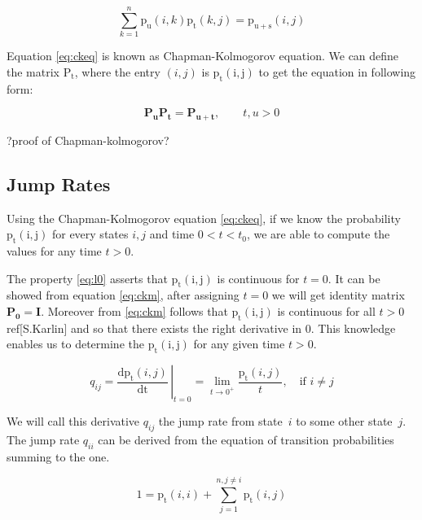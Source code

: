 \documentclass[thesis=M,english]{FITthesis}[2012/10/20]
\newcommand{\matr}[1]{\mathbf{#1}}
\begin{document}
\begin{equation}\label{eq:ckeq}
\sum_{k = 1}^n\mathrm{p_u}(i,k)\mathrm{p_t}(k,j) = \mathrm{p_{u+s}}(i,j)     
\end{equation}

Equation \eqref{eq:ckeq} is known as Chapman-Kolmogorov equation. 
We can define the matrix $\mathrm{P_t}$, where the entry $(i,j)$ is $\mathrm{p_t(i,j)}$ to get the equation in following form:

\begin{equation}\label{eq:ckm}
\matr{P_u} \matr{P_t} = \matr{P_{u+t}},   \qquad t,u > 0  
\end{equation}

?proof of Chapman-kolmogorov?


\subsection{ Jump Rates }

Using the Chapman-Kolmogorov equation \eqref{eq:ckeq}, if we know the probability $\mathrm{p_t(i,j)}$ for every states $i,j$ and time $0 < t < t_0$, we are able to compute the values for any time $t > 0$. 

The property \eqref{eq:l0}  asserts that $\mathrm{p_t(i,j)}$ is continuous for $t=0$. It can be showed from equation \eqref{eq:ckm}, after assigning $t=0$ we will get identity matrix $\matr{P_0} = \matr{I}$.
Moreover from \eqref{eq:ckm} follows that $\mathrm{p_t(i,j)}$ is continuous for all $t>0$ ref[S.Karlin] and so that there exists the right derivative in 0. This knowledge enables us to determine the $\mathrm{p_t(i,j)}$ for any given time $t>0$.   

\begin{equation}
q_{ij} =  \left.\frac{\mathrm{d}\mathrm{p_t}(i,j)}{\mathrm{dt}} \,\right|_{t=0} = \lim_{t \to 0^+} \frac{\mathrm{p_t}(i,j)}{t}, \quad \text{if } i\neq j     
\end{equation}

We will call this derivative $q_{ij}$ the jump rate from state~$i$ to some other state~$j$. The jump rate $q_{ii}$ can be derived from the equation of transition probabilities summing to the one.

\begin{equation}
1 = \mathrm{p_t}(i,i) + \sum_{j = 1}^{ n ,j \neq i} \mathrm{p_t}(i,j) 
\end{equation}
\end{document}
